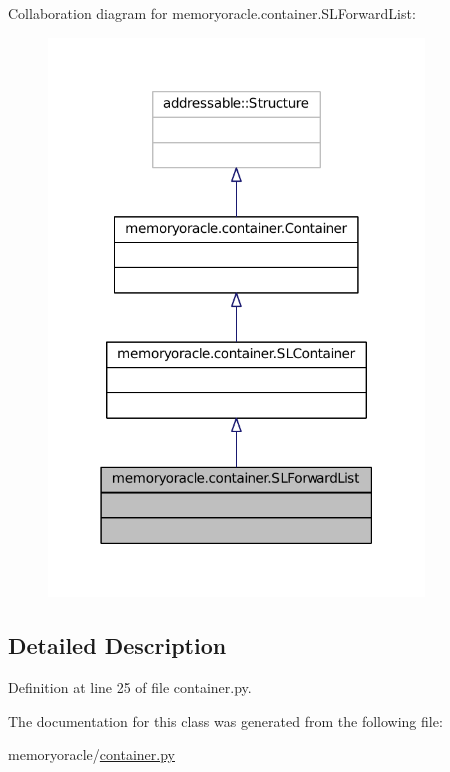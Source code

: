 Collaboration diagram for memoryoracle.\+container.\+S\+L\+Forward\+List\+:\nopagebreak
\begin{figure}[H]
\begin{center}
\leavevmode
\includegraphics[width=283pt]{classmemoryoracle_1_1container_1_1SLForwardList__coll__graph}
\end{center}
\end{figure}


\subsection{Detailed Description}


Definition at line 25 of file container.\+py.



The documentation for this class was generated from the following file\+:\begin{DoxyCompactItemize}
\item 
memoryoracle/\hyperlink{container_8py}{container.\+py}\end{DoxyCompactItemize}
